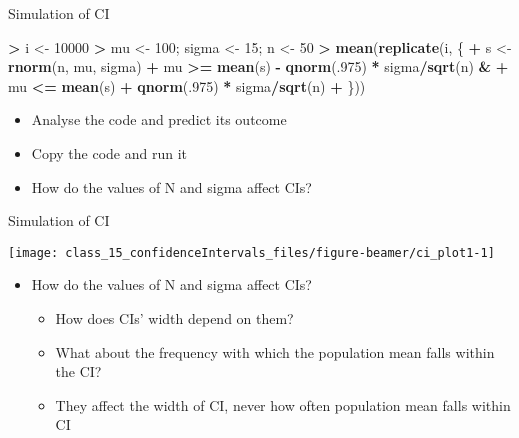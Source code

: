 \documentclass[
  ignorenonframetext,
]{beamer}
\newenvironment{Shaded}{\begin{snugshade}}{\end{snugshade}}
\newcommand{\DecValTok}[1]{\textcolor[rgb]{0.00,0.00,0.81}{#1}}
\newcommand{\FunctionTok}[1]{\textcolor[rgb]{0.13,0.29,0.53}{\textbf{#1}}}
\newcommand{\NormalTok}[1]{#1}
\newcommand{\OtherTok}[1]{\textcolor[rgb]{0.56,0.35,0.01}{#1}}
\newcommand{\SpecialCharTok}[1]{\textcolor[rgb]{0.81,0.36,0.00}{\textbf{#1}}}
\providecommand{\tightlist}{%
  \setlength{\itemsep}{0pt}\setlength{\parskip}{0pt}}
\begin{document}
\begin{frame}[fragile]{Simulation of CI}
\label{simulation-of-ci}
\begin{Shaded}
\begin{Highlighting}[]
\SpecialCharTok{\textgreater{}}\NormalTok{ i }\OtherTok{\textless{}{-}} \DecValTok{10000}
\SpecialCharTok{\textgreater{}}\NormalTok{ mu }\OtherTok{\textless{}{-}} \DecValTok{100}\NormalTok{; sigma }\OtherTok{\textless{}{-}} \DecValTok{15}\NormalTok{; n }\OtherTok{\textless{}{-}} \DecValTok{50}
\SpecialCharTok{\textgreater{}} \FunctionTok{mean}\NormalTok{(}\FunctionTok{replicate}\NormalTok{(i, \{}
\SpecialCharTok{+}\NormalTok{    s }\OtherTok{\textless{}{-}} \FunctionTok{rnorm}\NormalTok{(n, mu, sigma)}
\SpecialCharTok{+}\NormalTok{    mu }\SpecialCharTok{\textgreater{}=} \FunctionTok{mean}\NormalTok{(s) }\SpecialCharTok{{-}} \FunctionTok{qnorm}\NormalTok{(.}\DecValTok{975}\NormalTok{) }\SpecialCharTok{*}\NormalTok{ sigma}\SpecialCharTok{/}\FunctionTok{sqrt}\NormalTok{(n) }\SpecialCharTok{\&}
\SpecialCharTok{+}\NormalTok{    mu }\SpecialCharTok{\textless{}=} \FunctionTok{mean}\NormalTok{(s) }\SpecialCharTok{+} \FunctionTok{qnorm}\NormalTok{(.}\DecValTok{975}\NormalTok{) }\SpecialCharTok{*}\NormalTok{ sigma}\SpecialCharTok{/}\FunctionTok{sqrt}\NormalTok{(n)}
\SpecialCharTok{+}\NormalTok{ \}))}
\end{Highlighting}
\end{Shaded}

\begin{itemize}
\tightlist
\item
  Analyse the code and predict its outcome
\item
  Copy the code and run it
\item
  How do the values of N and sigma affect CIs?
\end{itemize}
\end{frame}

\begin{frame}{Simulation of CI}
\label{simulation-of-ci-1}
\begin{center}\texttt{[image: class\_15\_confidenceIntervals\_files/figure-beamer/ci\_plot1-1]} \end{center}

\begin{itemize}
\tightlist
\item
  How do the values of N and sigma affect CIs?

  \begin{itemize}
  \tightlist
  \item
    How does CIs' width depend on them?
  \item
    What about the frequency with which the population mean falls within
    the CI?
  \item
    They affect the width of CI, never how often population mean falls
    within CI
  \end{itemize}
\end{itemize}
\end{frame}
\end{document}
